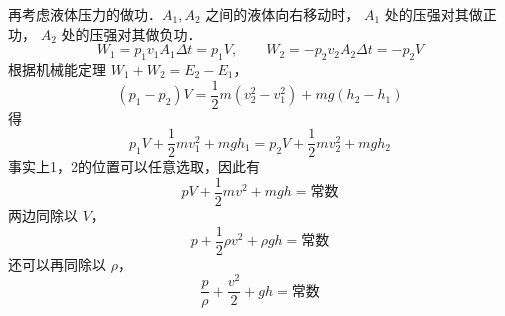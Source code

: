 再考虑液体压力的做功．$A_1,A_2$ 之间的液体向右移动时， $A_1$ 处的压强对其做正功， $A_2$ 处的压强对其做负功．
\begin{equation}
W_1=p_1v_1A_1\Delta t=p_1V, \qquad
W_2=-p_2v_2A_2 \Delta t=-p_2V 
\end{equation}
根据机械能定理 $W_1 + W_2 = E_2 - E_1$，
\begin{equation}
(p_1-p_2)V= \frac{1}{2}m(v_2^2-v_1^2)+mg(h_2-h_1)
\end{equation}
得
\begin{equation}
p_1V+\frac{1}{2}mv_1^2+mgh_1=p_2V+\frac{1}{2}mv_2^2+mgh_2
\end{equation}
事实上1，2的位置可以任意选取，因此有
\begin{equation}
pV+\frac{1}{2}mv^2+mgh=\text{常数}
\end{equation}
两边同除以 $V$，
\begin{equation}
p+\frac{1}{2}\rho v^2+\rho gh=\text{常数}
\end{equation}
还可以再同除以 $\rho$，
\begin{equation}
\frac{p}{\rho} + \frac{v^2}{2} + gh = \text{常数}
\end{equation}




